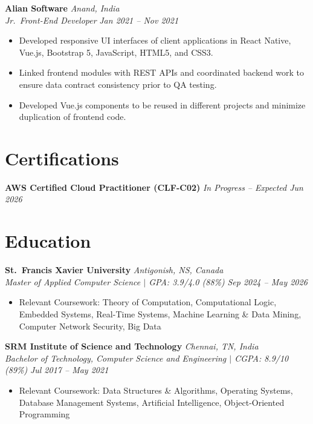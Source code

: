 \documentclass[10pt, letterpaper]{article}
\newcommand{\resumeItem}[1]{\item\small{#1}}
\newcommand{\resumeSubheading}[4]{
  \textbf{#3} \hfill \textit{\small #4} \\
  \textit{\small #1} \hfill \textit{\small #2}
}
\begin{document}
\vspace{3pt}

\resumeSubheading{Jr.\ Front-End Developer}{Jan 2021 -- Nov 2021}{Alian Software}{Anand, India}
\begin{itemize}[leftmargin=1.5em, itemsep=0pt, topsep=2pt]
  \resumeItem{Developed responsive UI interfaces of client applications in React Native, Vue.js, Bootstrap 5, JavaScript, HTML5, and CSS3.}
  \resumeItem{Linked frontend modules with REST APIs and coordinated backend work to ensure data contract consistency prior to QA testing.}
  \resumeItem{Developed Vue.js components to be reused in different projects and minimize duplication of frontend code.}
\end{itemize}

\vspace{1pt}

\section{Certifications}
\small
\textbf{AWS Certified Cloud Practitioner (CLF-C02)} \hfill \textit{In Progress -- Expected Jun 2026}

\vspace{1pt}

\section{Education}

\resumeSubheading{Master of Applied Computer Science $|$ GPA: 3.9/4.0 (88\%)}{Sep 2024 -- May 2026}{St.\ Francis Xavier University}{Antigonish, NS, Canada}
\begin{itemize}[leftmargin=1.5em, itemsep=0pt, topsep=2pt]
  \resumeItem{Relevant Coursework: Theory of Computation, Computational Logic, Embedded Systems, Real-Time Systems, Machine Learning \& Data Mining, Computer Network Security, Big Data}
\end{itemize}

\vspace{3pt}

\resumeSubheading{Bachelor of Technology, Computer Science and Engineering $|$ CGPA: 8.9/10 (89\%)}{Jul 2017 -- May 2021}{SRM Institute of Science and Technology}{Chennai, TN, India}
\begin{itemize}[leftmargin=1.5em, itemsep=0pt, topsep=2pt]
  \resumeItem{Relevant Coursework: Data Structures \& Algorithms, Operating Systems, Database Management Systems, Artificial Intelligence, Object-Oriented Programming}
\end{itemize}
\end{document}
